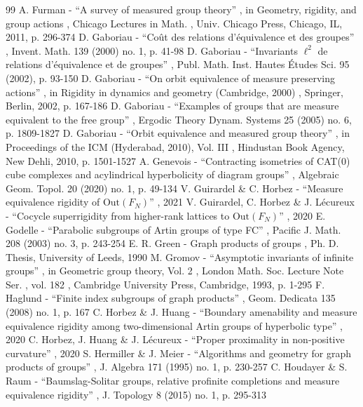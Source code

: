 \documentclass[11pt]{article}
\numberwithin{equation}{section}
\theoremstyle{plain}
\theoremstyle{definition}
\begin{document}
\begin{thebibliography}{99}
 A. Furman - “A survey of measured group theory” , in Geometry, rigidity, and group actions , Chicago Lectures in Math. , Univ. Chicago Press, Chicago, IL, 2011, p. 296-374
 D. Gaboriau - “Coût des relations d’équivalence et des groupes” , Invent. Math. 139 (2000) no. 1, p. 41-98
 D. Gaboriau - “Invariants $\ell ^2$ de relations d’équivalence et de groupes” , Publ. Math. Inst. Hautes Études Sci. 95 (2002), p. 93-150
 D. Gaboriau - “On orbit equivalence of measure preserving actions” , in Rigidity in dynamics and geometry (Cambridge, 2000) , Springer, Berlin, 2002, p. 167-186
 D. Gaboriau - “Examples of groups that are measure equivalent to the free group” , Ergodic Theory Dynam. Systems 25 (2005) no. 6, p. 1809-1827
 D. Gaboriau - “Orbit equivalence and measured group theory” , in Proceedings of the ICM (Hyderabad, 2010), Vol. III , Hindustan Book Agency, New Dehli, 2010, p. 1501-1527
 A. Genevois - “Contracting isometries of CAT(0) cube complexes and acylindrical hyperbolicity of diagram groups” , Algebraic Geom. Topol. 20 (2020) no. 1, p. 49-134
 V. Guirardel \& C. Horbez - “Measure equivalence rigidity of $\mathrm{Out}({F}_{N})$” , 2021
 V. Guirardel, C. Horbez \& J. Lécureux - “Cocycle superrigidity from higher-rank lattices to $\mathrm{Out}({F}_{N})$” , 2020
 E. Godelle - “Parabolic subgroups of Artin groups of type FC” , Pacific J. Math. 208 (2003) no. 3, p. 243-254
 E. R. Green - Graph products of groups , Ph. D. Thesis, University of Leeds, 1990
 M. Gromov - “Asymptotic invariants of infinite groups” , in Geometric group theory, Vol. 2 , London Math. Soc. Lecture Note Ser. , vol. 182 , Cambridge University Press, Cambridge, 1993, p. 1-295
 F. Haglund - “Finite index subgroups of graph products” , Geom. Dedicata 135 (2008) no. 1, p. 167
 C. Horbez \& J. Huang - “Boundary amenability and measure equivalence rigidity among two-dimensional Artin groups of hyperbolic type” , 2020
 C. Horbez, J. Huang \& J. Lécureux - “Proper proximality in non-positive curvature” , 2020
 S. Hermiller \& J. Meier - “Algorithms and geometry for graph products of groups” , J. Algebra 171 (1995) no. 1, p. 230-257
 C. Houdayer \& S. Raum - “Baumslag-Solitar groups, relative profinite completions and measure equivalence rigidity” , J. Topology 8 (2015) no. 1, p. 295-313

\end{thebibliography}
\end{document}
